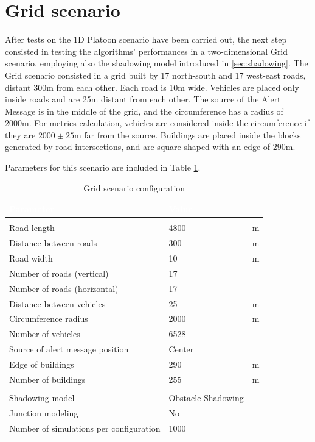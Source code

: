 	\section{Grid scenario}
		\label{sec:grid}
		After tests on the 1D Platoon scenario have been carried out, the next step consisted in testing the algorithms' performances in a two-dimensional Grid scenario, employing also the shadowing model introduced in \ref{sec:shadowing}. The Grid scenario consisted in a grid built by 17 north-south and 17 west-east roads, distant 300m from each other. Each road is 10m wide. Vehicles are placed only inside roads and are 25m distant from each other. The source of the Alert Message is in the middle of the grid, and the circumference has a radius of 2000m. For metrics calculation, vehicles are considered inside the circumference if they are $2000 \pm 25$m far from the source. Buildings are placed inside the blocks generated by road intersections, and are square shaped with an edge of 290m.
		
		
		Parameters for this scenario are included in Table \ref{tab:grid}.  
		
		\begin{table}[H]
			\def\arraystretch{1.1}
			\begin{tabularx}{\textwidth}{l | l  l}
				\rowcolor{I} {\large \textcolor{white}{Parameter}} & {\large \textcolor{white}{Value}} & {\large \textcolor{white}{}} \TBstrut  \\
				\toprule
				\endhead
				\rowcolor{P} \multicolumn{3}{c}{Scenario configuration} \\
				\midrule[1pt]
				Road length 							& 4800	 				& m		\\
				Distance between roads					& 300					& m		\\
				Road width								& 10					& m		\\
				Number of roads (vertical)				& 17					&		\\
				Number of roads (horizontal)			& 17					&		\\
				Distance between vehicles 				& 25					& m		\\
				Circumference radius					& 2000					& m		\\
				Number of vehicles						& 6528					& 		\\
				Source of alert message position		& Center				&		\\
				Edge of buildings						& 290					& m		\\
				Number of buildings						& 255					& m		\\
				\midrule[1pt]
				\rowcolor{P} \multicolumn{3}{c}{Simulator configuration} \\
				\midrule[1pt]
				Shadowing model							& Obstacle Shadowing	&		\\
				Junction modeling						& No					&		\\
				\midrule[1pt]
				Number of simulations per configuration	& 1000					&		\\
				\bottomrule
			\end{tabularx}
			\caption{Grid scenario configuration}
			\label{tab:grid}
		\end{table}
	

